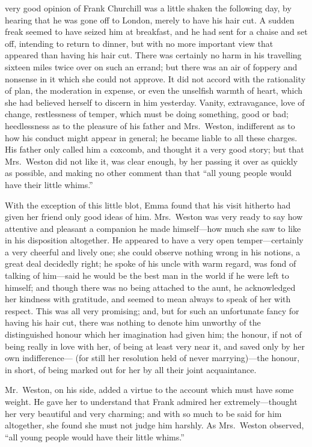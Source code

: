  very good opinion of Frank Churchill was a little shaken
the following day, by hearing that he was gone off to London,
merely to have his hair cut.  A sudden freak seemed to have seized him
at breakfast, and he had sent for a chaise and set off, intending to
return to dinner, but with no more important view that appeared than
having his hair cut.  There was certainly no harm in his travelling
sixteen miles twice over on such an errand; but there was an air
of foppery and nonsense in it which she could not approve.  It did
not accord with the rationality of plan, the moderation in expense,
or even the unselfish warmth of heart, which she had believed herself
to discern in him yesterday.  Vanity, extravagance, love of change,
restlessness of temper, which must be doing something, good or bad;
heedlessness as to the pleasure of his father and Mrs.\ Weston,
indifferent as to how his conduct might appear in general; he became
liable to all these charges.  His father only called him a coxcomb,
and thought it a very good story; but that Mrs.\ Weston did not like it,
was clear enough, by her passing it over as quickly as possible,
and making no other comment than that ``all young people would have
their little whims.''

With the exception of this little blot, Emma found that his visit
hitherto had given her friend only good ideas of him.  Mrs.\ Weston
was very ready to say how attentive and pleasant a companion he
made himself---how much she saw to like in his disposition altogether.
He appeared to have a very open temper---certainly a very cheerful
and lively one; she could observe nothing wrong in his notions,
a great deal decidedly right; he spoke of his uncle with warm regard,
was fond of talking of him---said he would be the best man in the
world if he were left to himself; and though there was no being
attached to the aunt, he acknowledged her kindness with gratitude,
and seemed to mean always to speak of her with respect.
This was all very promising; and, but for such an unfortunate fancy
for having his hair cut, there was nothing to denote him unworthy
of the distinguished honour which her imagination had given him;
the honour, if not of being really in love with her, of being
at least very near it, and saved only by her own indifference---%
(for still her resolution held of never marrying)---the honour, in short,
of being marked out for her by all their joint acquaintance.

Mr.\ Weston, on his side, added a virtue to the account which must
have some weight.  He gave her to understand that Frank admired
her extremely---thought her very beautiful and very charming;
and with so much to be said for him altogether, she found she must
not judge him harshly.  As Mrs.\ Weston observed, ``all young people
would have their little whims.''

